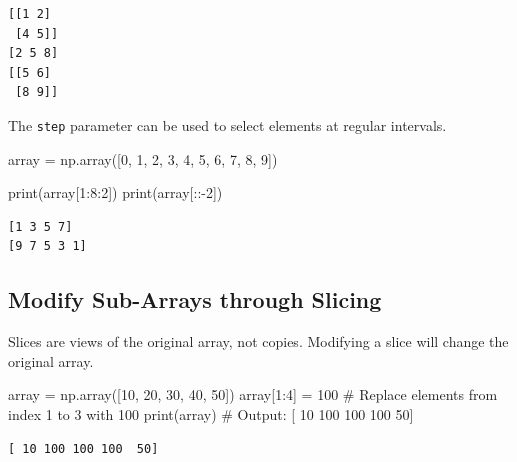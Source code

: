 \documentclass[
  letterpaper,
  DIV=11,
  numbers=noendperiod]{scrreprt}
\newenvironment{Shaded}{\begin{snugshade}}{\end{snugshade}}
\newcommand{\BuiltInTok}[1]{\textcolor[rgb]{0.00,0.23,0.31}{#1}}
\newcommand{\CommentTok}[1]{\textcolor[rgb]{0.37,0.37,0.37}{#1}}
\newcommand{\DecValTok}[1]{\textcolor[rgb]{0.68,0.00,0.00}{#1}}
\newcommand{\NormalTok}[1]{\textcolor[rgb]{0.00,0.23,0.31}{#1}}
\newcommand{\OperatorTok}[1]{\textcolor[rgb]{0.37,0.37,0.37}{#1}}
\begin{document}
\begin{verbatim}
[[1 2]
 [4 5]]
[2 5 8]
[[5 6]
 [8 9]]
\end{verbatim}

The \texttt{step} parameter can be used to select elements at regular
intervals.

\begin{Shaded}
\begin{Highlighting}[]
\NormalTok{array }\OperatorTok{=}\NormalTok{ np.array([}\DecValTok{0}\NormalTok{, }\DecValTok{1}\NormalTok{, }\DecValTok{2}\NormalTok{, }\DecValTok{3}\NormalTok{, }\DecValTok{4}\NormalTok{, }\DecValTok{5}\NormalTok{, }\DecValTok{6}\NormalTok{, }\DecValTok{7}\NormalTok{, }\DecValTok{8}\NormalTok{, }\DecValTok{9}\NormalTok{])}

\BuiltInTok{print}\NormalTok{(array[}\DecValTok{1}\NormalTok{:}\DecValTok{8}\NormalTok{:}\DecValTok{2}\NormalTok{]) }
\BuiltInTok{print}\NormalTok{(array[::}\OperatorTok{{-}}\DecValTok{2}\NormalTok{])  }
\end{Highlighting}
\end{Shaded}

\begin{verbatim}
[1 3 5 7]
[9 7 5 3 1]
\end{verbatim}

\hypertarget{modify-sub-arrays-through-slicing}{%
\subsection{Modify Sub-Arrays through
Slicing}\label{modify-sub-arrays-through-slicing}}

Slices are views of the original array, not copies. Modifying a slice
will change the original array.

\begin{Shaded}
\begin{Highlighting}[]
\NormalTok{array }\OperatorTok{=}\NormalTok{ np.array([}\DecValTok{10}\NormalTok{, }\DecValTok{20}\NormalTok{, }\DecValTok{30}\NormalTok{, }\DecValTok{40}\NormalTok{, }\DecValTok{50}\NormalTok{])}
\NormalTok{array[}\DecValTok{1}\NormalTok{:}\DecValTok{4}\NormalTok{] }\OperatorTok{=} \DecValTok{100}  \CommentTok{\# Replace elements from index 1 to 3 with 100}
\BuiltInTok{print}\NormalTok{(array)  }\CommentTok{\# Output: [ 10 100 100 100  50]}
\end{Highlighting}
\end{Shaded}

\begin{verbatim}
[ 10 100 100 100  50]
\end{verbatim}
\end{document}
